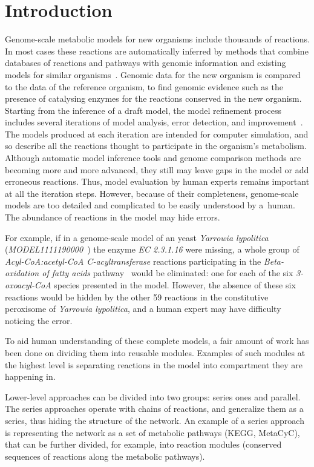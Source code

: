 \documentclass[10pt]{bmc_article}
\newenvironment{bmcformat}{\baselineskip20pt\sloppy\setboolean{publ}{false}}{\baselineskip20pt\sloppy}
\begin{document}
\begin{bmcformat}
\section*{Introduction}
Genome-scale metabolic models for new organisms include thousands of reactions. In most cases these reactions are automatically inferred by methods that combine databases of reactions and pathways with genomic information and existing models for similar organisms~\cite{Swainston2011}. Genomic data for the new organism is compared to the data of the reference organism, to find genomic evidence such as the presence of catalysing enzymes for the reactions conserved in the new organism. Starting from the inference of a draft model, the model refinement process includes several iterations of model analysis, error detection, and improvement~\cite{Thiele2010}. The models produced at each iteration are intended for computer simulation, and so describe all the reactions thought to participate in the organism's metabolism. Although automatic model inference tools and genome comparison methods are becoming more and more advanced, they still may leave gaps in the model or add erroneous reactions. Thus, model evaluation by human experts remains important at all the iteration steps. However, because of their completeness, genome-scale models are too detailed and complicated to be easily understood by a~human. The abundance of reactions in the model may hide errors.

For example, if in a genome-scale model of an yeast \textit{Yarrowia lypolitica} (\emph{MODEL1111190000}~\cite{Loira12}) the enzyme \textit{EC 2.3.1.16} were missing, a whole group of \textit{Acyl-CoA:acetyl-CoA C-acyltransferase} reactions participating in the \textit{Beta-oxidation of fatty acids} pathway~\cite{Metzler01} would be eliminated: one for each of the six \textit{3-oxoacyl-CoA} species presented in the model. However, the absence of these six reactions would be hidden by the other 59 reactions in the constitutive peroxisome of \textit{Yarrowia lypolitica}, and a human expert may have difficulty noticing the error.

To aid human understanding of these complete models, a fair amount of work has been done on dividing them into reusable modules. Examples of such modules at the highest level is separating reactions in the model into compartment they are happening in. 

Lower-level approaches can be divided into two groups: series ones and parallel. The series approaches operate with chains of reactions, and generalize them as a series, thus hiding the structure of the network. An example of a series approach is representing the network as a set of metabolic pathways (KEGG\cite{Kanehisa12}, MetaCyC\cite{Caspi2008}), that can be further divided, for example, into reaction modules (conserved sequences of reactions along the metabolic pathways)\cite{Muto2013}. 


\end{bmcformat}
\end{document}
